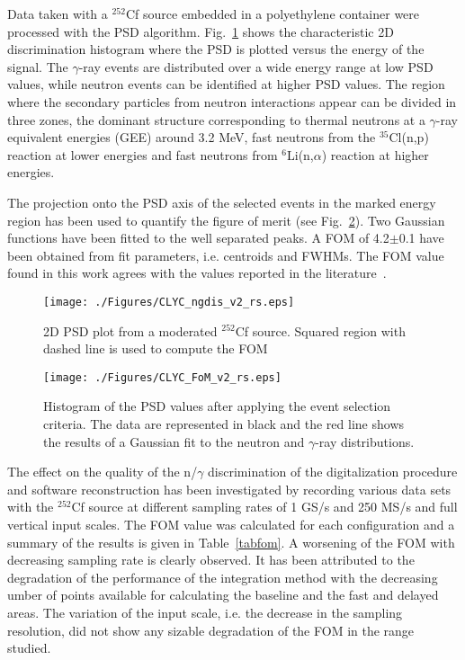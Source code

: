 \documentclass[review,number,sort&compress]{elsarticle}
\begin{document}
Data taken with a $^{252}$Cf source embedded in a polyethylene container were processed with the PSD algorithm. Fig.~\ref{ngamma} shows the characteristic 2D discrimination histogram where the PSD is plotted versus the energy of the signal. The $\gamma$-ray events are distributed over a wide energy range at low PSD values, while neutron events can be identified at higher PSD values. The region where the secondary particles from neutron interactions appear can be divided in three zones, the dominant structure corresponding to thermal neutrons at a $\gamma$-ray equivalent energies (GEE) around 3.2 MeV, fast neutrons from the $^{35}$Cl(n,p) reaction at lower energies and fast neutrons from $^{6}$Li(n,$\alpha$) reaction at higher energies.   

The projection onto the PSD axis of the selected events in the marked energy region has been used to quantify the figure of merit (see Fig.~\ref{fom}). Two Gaussian functions have been fitted to the well separated peaks. A FOM of 4.2$\pm$0.1 have been obtained from fit parameters, i.e. centroids and FWHMs. The FOM value found in this work agrees with the values reported in the literature~\cite{Oly2, Lee}.  

\begin{figure}[h!]
\centering
\texttt{[image: ./Figures/CLYC\_ngdis\_v2\_rs.eps]}
\caption{2D PSD plot from a moderated $^{252}$Cf source. Squared region with dashed line is used to compute the FOM}
\label{ngamma}
\end{figure}

\begin{figure}[h!]
\centering
\texttt{[image: ./Figures/CLYC\_FoM\_v2\_rs.eps]}
\caption{Histogram of the PSD values after applying the event selection criteria. The data are represented in black and the red line shows the results of a Gaussian fit to the neutron and $\gamma$-ray distributions.}
\label{fom}
\end{figure}

The effect on the quality of the n/$\gamma$ discrimination of the digitalization procedure and software reconstruction has been investigated by recording various data sets with the  $^{252}$Cf source at different sampling rates of 1 GS/s and 250 MS/s and full vertical input scales. The FOM value was calculated for each configuration and a summary of the results is given in Table~\ref{tabfom}. A worsening of the FOM with decreasing sampling rate is clearly observed. It has been attributed to the degradation of the performance of the integration method with the decreasing umber of points available for calculating the baseline and the fast and delayed areas. The variation of the input scale, i.e. the decrease in the sampling resolution, did not show any sizable degradation of the FOM in the range studied.
\end{document}
